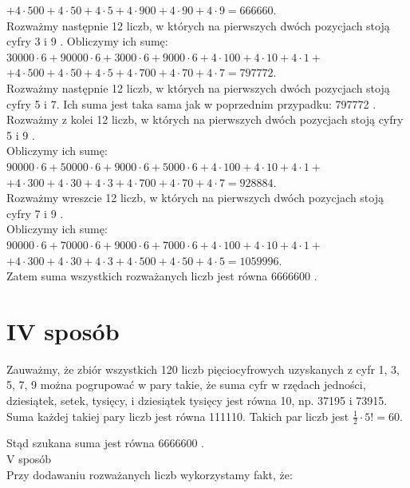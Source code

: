 \documentclass[10pt]{article}
\begin{document}
$+4 \cdot 500+4 \cdot 50+4 \cdot 5+4 \cdot 900+4 \cdot 90+4 \cdot 9=666660$.\\
Rozważmy następnie 12 liczb, w których na pierwszych dwóch pozycjach stoją cyfry 3 i 9 . Obliczymy ich sumę:\\
$30000 \cdot 6+90000 \cdot 6+3000 \cdot 6+9000 \cdot 6+4 \cdot 100+4 \cdot 10+4 \cdot 1+$ $+4 \cdot 500+4 \cdot 50+4 \cdot 5+4 \cdot 700+4 \cdot 70+4 \cdot 7=797772$.\\
Rozważmy następnie 12 liczb, w których na pierwszych dwóch pozycjach stoją cyfry 5 i 7. Ich suma jest taka sama jak w poprzednim przypadku: 797772 .\\
Rozważmy z kolei 12 liczb, w których na pierwszych dwóch pozycjach stoją cyfry 5 i 9 .\\
Obliczymy ich sumę:\\
$90000 \cdot 6+50000 \cdot 6+9000 \cdot 6+5000 \cdot 6+4 \cdot 100+4 \cdot 10+4 \cdot 1+$\\
$+4 \cdot 300+4 \cdot 30+4 \cdot 3+4 \cdot 700+4 \cdot 70+4 \cdot 7=928884$.\\
Rozważmy wreszcie 12 liczb, w których na pierwszych dwóch pozycjach stoją cyfry 7 i 9 .\\
Obliczymy ich sumę:\\
$90000 \cdot 6+70000 \cdot 6+9000 \cdot 6+7000 \cdot 6+4 \cdot 100+4 \cdot 10+4 \cdot 1+$\\
$+4 \cdot 300+4 \cdot 30+4 \cdot 3+4 \cdot 500+4 \cdot 50+4 \cdot 5=1059996$.\\
Zatem suma wszystkich rozważanych liczb jest równa 6666600 .

\section*{IV sposób}
Zauważmy, że zbiór wszystkich 120 liczb pięciocyfrowych uzyskanych z cyfr 1, 3, 5, 7, 9 można pogrupować w pary takie, że suma cyfr w rzędach jedności, dziesiątek, setek, tysięcy, i dziesiątek tysięcy jest równa 10, np. 37195 i 73915. Suma każdej takiej pary liczb jest równa 111110. Takich par liczb jest $\frac{1}{2} \cdot 5!=60$.

Stąd szukana suma jest równa 6666600 .\\
V sposób\\
Przy dodawaniu rozważanych liczb wykorzystamy fakt, że:
\end{document}
